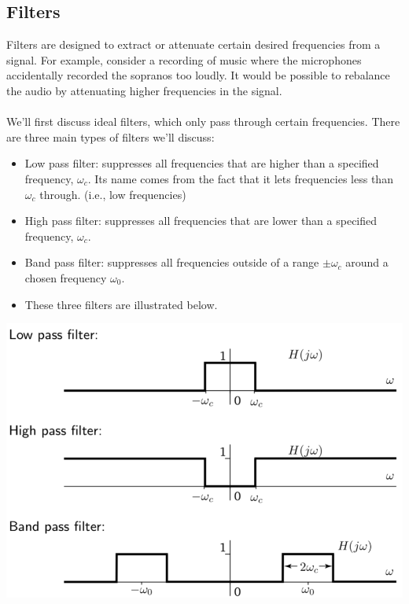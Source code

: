 \documentclass[10pt]{article}
\begin{document}
\subsection*{Filters}
Filters are designed to extract or attenuate certain desired frequencies from a signal.  For example, consider a recording of music where the microphones accidentally recorded the sopranos too loudly. It would be possible to rebalance the audio by attenuating higher frequencies in the signal.\\\\
We'll first discuss ideal filters, which only pass through certain frequencies.  There are three main types of filters we'll discuss:
\begin{itemize}
    \item Low pass filter: suppresses all frequencies that are higher than a specified frequency, $\omega_c$.  Its name comes from the fact that it lets frequencies less than $\omega_c$ through.  (i.e., low frequencies)
    \item High pass filter: suppresses all frequencies that are lower than a specified frequency, $\omega_c$.
    \item Band pass filter: suppresses all frequencies outside of a range $\pm \omega_c$ around a chosen frequency $\omega_0$.
    \item These three filters are illustrated below.
\end{itemize}
\begin{center}
    \includegraphics[scale=0.8]{W7_4.png}
\end{center}
\end{document}

